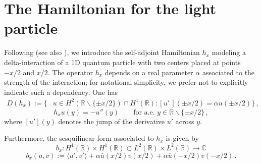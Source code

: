 \documentclass[a4paper,11pt,reqno]{amsart}
\theoremstyle{definition}
\numberwithin{equation}{section}
\newcommand{\CO}{\mathbb C}
\newcommand{\RE}{\mathbb R}
\begin{document}
\section{The Hamiltonian for the light particle\label{s:light}}
Following \cite[Section II.2.1]{AGHKH05} (see also \cite[Section 8.5]{Teta}), we introduce the self-adjoint Hamiltonian $h_{x}$ modeling a delta-interaction of a 1D quantum particle with two centers placed at points $-x/2$ and $x/2$. The operator $h_{x}$ depends on a real parameter 
$\alpha$ associated to  the strength of the interaction; for notational simplicity, we prefer not to explicitly indicate such a dependency. One has
\begin{equation}\label{hx-dom}
\begin{aligned}
D(h_x):= \big\{ & u \in H^2(\RE\backslash\{\pm x/2\})\cap H^1(\RE): [u'\,](\pm x/2)=\alpha u(\pm x/2)\big\}\,,
\end{aligned}
\end{equation}
\begin{equation}\label{hx}
h_x u(y)  = -u''(y) \qquad \text{for a.e. $y \in \RE\backslash \{\pm x/2\}$}\,,
\end{equation}
where $[u'](y)$ denotes the jump of the derivative $u'$ across $y$.\par 
Furthermore, the sesquilinear form associated to $h_{x}$ is given by  
\begin{equation}\label{sesbx1}
b_{x}: H^1(\RE) \times H^1(\RE)\subset L^{2}(\RE)\times
 L^{2}(\RE)\to\CO
 \end{equation}
\begin{equation}\label{sesbx2}
b_x (u,v) := \langle u', v'\rangle + \alpha \bar u(x/2)v(x/2)+\alpha \bar u(-x/2)v(-x/2)\,.
\end{equation}
\end{document}
